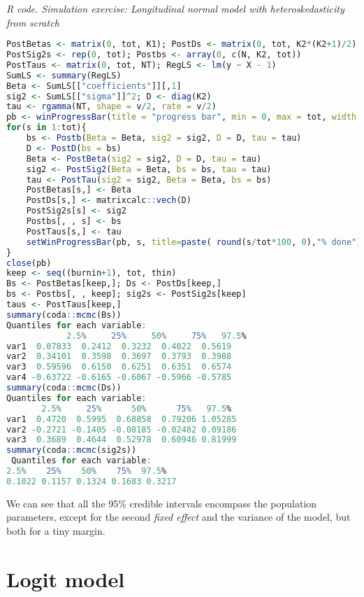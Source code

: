 \begin{tcolorbox}[enhanced,width=4.67in,center upper,
	fontupper=\large\bfseries,drop shadow southwest,sharp corners]
	\textit{R code. Simulation exercise: Longitudinal normal model with heteroskedasticity from scratch}
	\begin{VF}
		\begin{lstlisting}[language=R]
PostBetas <- matrix(0, tot, K1); PostDs <- matrix(0, tot, K2*(K2+1)/2)
PostSig2s <- rep(0, tot); Postbs <- array(0, c(N, K2, tot))
PostTaus <- matrix(0, tot, NT); RegLS <- lm(y ~ X - 1)
SumLS <- summary(RegLS)
Beta <- SumLS[["coefficients"]][,1]
sig2 <- SumLS[["sigma"]]^2; D <- diag(K2)
tau <- rgamma(NT, shape = v/2, rate = v/2) 
pb <- winProgressBar(title = "progress bar", min = 0, max = tot, width = 300)
for(s in 1:tot){
	bs <- Postb(Beta = Beta, sig2 = sig2, D = D, tau = tau)
	D <- PostD(bs = bs)
	Beta <- PostBeta(sig2 = sig2, D = D, tau = tau)
	sig2 <- PostSig2(Beta = Beta, bs = bs, tau = tau)
	tau <- PostTau(sig2 = sig2, Beta = Beta, bs = bs)
	PostBetas[s,] <- Beta
	PostDs[s,] <- matrixcalc::vech(D)
	PostSig2s[s] <- sig2
	Postbs[, , s] <- bs
	PostTaus[s,] <- tau
	setWinProgressBar(pb, s, title=paste( round(s/tot*100, 0),"% done"))
}
close(pb)
keep <- seq((burnin+1), tot, thin)
Bs <- PostBetas[keep,]; Ds <- PostDs[keep,]
bs <- Postbs[, , keep]; sig2s <- PostSig2s[keep]
taus <- PostTaus[keep,]
summary(coda::mcmc(Bs))
Quantiles for each variable:
         	2.5%     25%     50%     75%   97.5%
var1  0.07833  0.2412  0.3232  0.4022  0.5619
var2  0.34101  0.3598  0.3697  0.3793  0.3988
var3  0.59596  0.6150  0.6251  0.6351  0.6574
var4 -0.63722 -0.6165 -0.6067 -0.5966 -0.5785
summary(coda::mcmc(Ds))
Quantiles for each variable:
       2.5%     25%      50%      75%   97.5%
var1  0.4720  0.5995  0.68858  0.79206 1.05285
var2 -0.2721 -0.1405 -0.08185 -0.02482 0.09186
var3  0.3689  0.4644  0.52978  0.60946 0.81999
summary(coda::mcmc(sig2s))
 Quantiles for each variable:
2.5%    25%    50%    75%  97.5% 
0.1022 0.1157 0.1324 0.1683 0.3217 
\end{lstlisting}
	\end{VF}
\end{tcolorbox}
We can see that all the 95\% credible intervals encompass the population parameters, except for the second \textit{fixed effect} and the variance of the model, but both for a tiny margin.  

\section{Logit model}\label{sec92}

